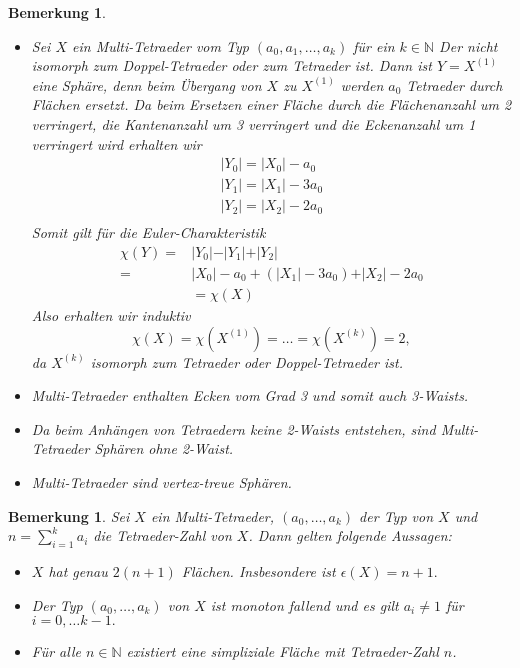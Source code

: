 \documentclass[12pt,titlepage,twoside,cleardoublepage]{article}
\theoremstyle{nummermitklammern}
\newtheorem{bemerkung}[temp]{Bemerkung}
\newtheorem{bemerkung}[zahl]{Bemerkung}
\numberwithin{equation}{section}
\begin{document}
\begin{bemerkung}
\begin{itemize}
\item Sei $X$ ein Multi-Tetraeder vom Typ $(a_0,a_1,\ldots,a_k)$ für ein $k\in \mathbb{N}$ Der nicht isomorph zum Doppel-Tetraeder oder zum Tetraeder ist. Dann ist $Y=X^{(1)}$ eine Sphäre, denn beim Übergang von $X$ zu $X^{(1)}$ werden $a_0$ Tetraeder durch Flächen ersetzt. Da beim Ersetzen einer Fläche durch die Flächenanzahl um 2 verringert, die Kantenanzahl um 3 verringert und die Eckenanzahl um 1 verringert wird erhalten wir  
\begin{align*}
\vert Y_0\vert =\vert X_0\vert-a_0\\
\vert Y_1\vert=\vert X_1\vert-3a_0\\
\vert Y_2\vert=\vert X_2\vert-2a_0\\
\end{align*}
Somit gilt für die Euler-Charakteristik
\begin{align*}
\chi(Y)=&\vert Y_0\vert -\vert Y_1\vert+\vert Y_2\vert\\
=&\vert X_0\vert-a_0+(\vert X_1\vert-3a_0)+\vert X_2\vert-2a_0\\
&=\chi (X)
\end{align*}
Also erhalten wir induktiv 
\[
\chi(X)=\chi(X^{(1)})=\ldots=\chi(X^{(k)})=2,
\]
da $X^{(k)}$ isomorph zum Tetraeder oder Doppel-Tetraeder ist.
\item Multi-Tetraeder enthalten Ecken vom Grad 3 und somit auch 3-Waists.

\item
Da beim Anhängen von Tetraedern keine 2-Waists entstehen, sind Multi-Tetraeder Sphären ohne 2-Waist.
\item
Multi-Tetraeder sind vertex-treue Sphären.
\end{itemize}
\end{bemerkung}
\begin{bemerkung}
Sei $X$ ein Multi-Tetraeder, $(a_0,\ldots,a_k)$ der Typ von $X$ und $n=\sum_{i=1}^{k}a_i$ die Tetraeder-Zahl von $X$. Dann gelten folgende Aussagen: 
\begin{itemize}
\item $X$ hat genau $2(n+1)$ Flächen. Insbesondere ist $\epsilon(X)=n+1.$
\item Der Typ $(a_0,\ldots,a_k)$ von $X$ ist monoton fallend und es gilt $a_i\neq 1$ für $i=0,\ldots k-1.$
\item  Für alle $n \in \mathbb{N}$ existiert eine simpliziale Fläche mit Tetraeder-Zahl $n$.
\end{itemize}
\end{bemerkung}
\end{document}
